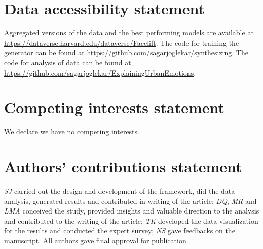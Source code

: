 \documentclass[]{rsos}%
\begin{document}
\maketitle






\section*{Data accessibility statement}
Aggregated versions of the data and the best performing models are available at \url{https://dataverse.harvard.edu/dataverse/Facelift}. The code for training the generator can be found at \url{https://github.com/sagarjoglekar/synthesizing}. The code for analysis of data can be found at \url{https://github.com/sagarjoglekar/ExplainingUrbanEmotions}.

\section*{Competing interests statement}

We declare we have no competing interests.

\section*{Authors' contributions statement}

\textsl{SJ} carried out the design and development of the framework, did the data analysis, generated results and contributed in writing of the article; \textsl{DQ}, \textsl{MR} and \textsl{LMA} conceived the study, provided insights and valuable direction to the analysis and contributed to the writing of the article; \textsl{TK} developed the data visualization for the results and conducted the expert survey; \textsl{NS} gave feedbacks  on the manuscript. All authors gave final approval for publication.

\end{document}
